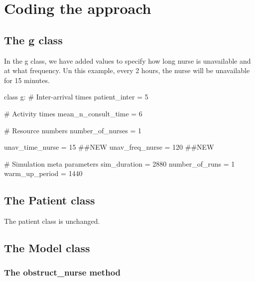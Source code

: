 \documentclass[
  letterpaper,
  DIV=11,
  numbers=noendperiod]{scrreprt}
\newenvironment{Shaded}{\begin{snugshade}}{\end{snugshade}}
\newcommand{\CommentTok}[1]{\textcolor[rgb]{0.37,0.37,0.37}{#1}}
\newcommand{\DecValTok}[1]{\textcolor[rgb]{0.68,0.00,0.00}{#1}}
\newcommand{\KeywordTok}[1]{\textcolor[rgb]{0.00,0.23,0.31}{#1}}
\newcommand{\NormalTok}[1]{\textcolor[rgb]{0.00,0.23,0.31}{#1}}
\newcommand{\OperatorTok}[1]{\textcolor[rgb]{0.37,0.37,0.37}{#1}}
\begin{document}
\section{Coding the approach}\label{coding-the-approach}

\subsection{The g class}\label{the-g-class-3}

In the g class, we have added values to specify how long nurse is
unavailable and at what frequency. Un this example, every 2 hours, the
nurse will be unavailable for 15 minutes.

\begin{Shaded}
\begin{Highlighting}[]
\KeywordTok{class}\NormalTok{ g:}
    \CommentTok{\# Inter{-}arrival times}
\NormalTok{    patient\_inter }\OperatorTok{=} \DecValTok{5}

    \CommentTok{\# Activity times}
\NormalTok{    mean\_n\_consult\_time }\OperatorTok{=} \DecValTok{6}

    \CommentTok{\# Resource numbers}
\NormalTok{    number\_of\_nurses }\OperatorTok{=} \DecValTok{1}

\NormalTok{    unav\_time\_nurse }\OperatorTok{=} \DecValTok{15} \CommentTok{\#\#NEW}
\NormalTok{    unav\_freq\_nurse }\OperatorTok{=} \DecValTok{120} \CommentTok{\#\#NEW}

    \CommentTok{\# Simulation meta parameters}
\NormalTok{    sim\_duration }\OperatorTok{=} \DecValTok{2880}
\NormalTok{    number\_of\_runs }\OperatorTok{=} \DecValTok{1}
\NormalTok{    warm\_up\_period }\OperatorTok{=} \DecValTok{1440}
\end{Highlighting}
\end{Shaded}

\subsection{The Patient class}\label{the-patient-class-3}

The patient class is unchanged.

\subsection{The Model class}\label{the-model-class-3}

\subsubsection{The obstruct\_nurse
method}\label{the-obstruct_nurse-method}
\end{document}
